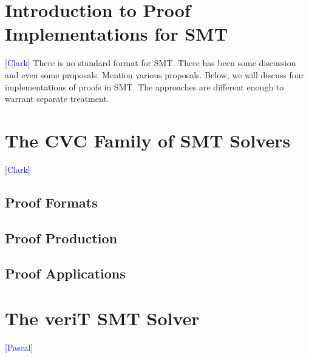 \documentclass{llncs}
\newcommand{\Note}[1]{\textcolor{blue}{[#1]}}
\begin{document}




\section{Introduction to Proof Implementations for SMT}

\Note{Clark}
There is no standard format for SMT.  There has been some discussion and even
some proposals.  Mention various proposals.  Below, we will discuss four
implementations of proofs in SMT.  The approaches are different enough to
warrant separate treatment.

\section{The CVC Family of SMT Solvers}
\Note{Clark}
\subsection{Proof Formats}
\subsection{Proof Production}
\subsection{Proof Applications}

\section{The veriT SMT Solver}
\Note{Pascal}
\end{document}
